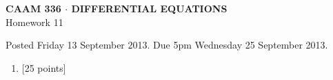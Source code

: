 \documentclass[10pt]{article}
\begin{document}
\vspace*{-5em}
\begin{center}
\large \textsf{\textbf{CAAM 336 $\cdot$ DIFFERENTIAL EQUATIONS}\\[0.5em]
Homework 11 }
\end{center}

Posted Friday 13 September 2013. Due 5pm Wednesday 25 September 2013.

\begin{enumerate}\addtocounter{enumi}{10}
\item {[25 points]}\\  

\end{enumerate}
\end{document}
